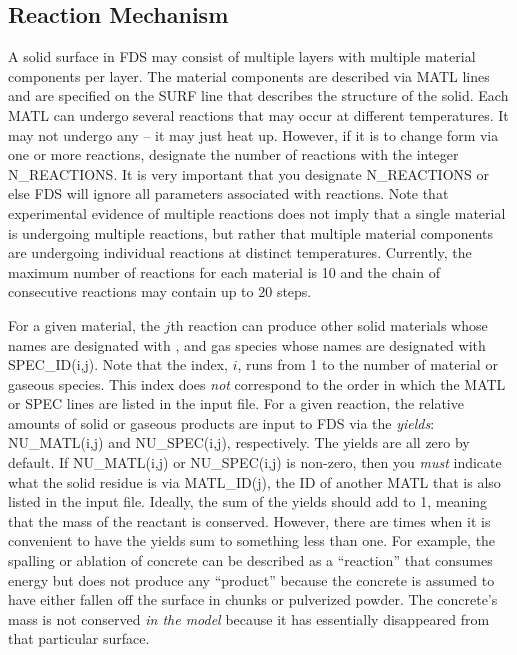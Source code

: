 \documentclass[11pt]{book}
\begin{document}
\subsection{Reaction Mechanism}

A solid surface in FDS may consist of multiple layers with multiple material components per layer. The material components are described via {\ct MATL} lines and are specified on the {\ct SURF} line that describes the structure of the solid.  Each {\ct MATL} can undergo several reactions that may occur at different temperatures. It may not undergo any -- it may just heat up. However, if it is to change form via one or more reactions, designate the number of reactions with the integer {\ct N\_REACTIONS}. It is very important that you designate {\ct N\_REACTIONS} or else FDS will ignore all parameters associated with reactions. Note that experimental evidence of multiple reactions does not imply that a single material is undergoing multiple reactions, but rather that multiple material components are undergoing individual reactions at distinct temperatures.  Currently, the maximum number of reactions for each material is 10 and the chain of consecutive reactions may contain up to 20 steps.

For a given material, the $j$th reaction can produce other solid materials whose names are designated with , and gas species whose names are designated with {\ct SPEC\_ID(i,j)}. Note that the index, $i$, runs from 1 to the number of material or gaseous species. This index does {\em not} correspond to the order in which the {\ct MATL} or {\ct SPEC} lines are listed in the input file. For a given reaction, the relative amounts of solid or gaseous products are input to FDS via the {\em yields}: {\ct NU\_MATL(i,j)} and {\ct NU\_SPEC(i,j)}, respectively. The yields are all zero by default. If {\ct NU\_MATL(i,j)} or {\ct NU\_SPEC(i,j)} is non-zero, then you {\em must} indicate what the solid residue is via {\ct MATL\_ID(j)}, the {\ct ID} of another {\ct MATL} that is also listed in the input file. Ideally, the sum of the yields should add to 1, meaning that the mass of the reactant is conserved. However, there are times when it is convenient to have the yields sum to something less than one. For example, the spalling or ablation of concrete can be described as a ``reaction'' that consumes energy but does not produce any ``product'' because the concrete is assumed to have either fallen off the surface in chunks or pulverized powder. The concrete's mass is not conserved {\em in the model} because it has essentially disappeared from that particular surface.
\end{document}
